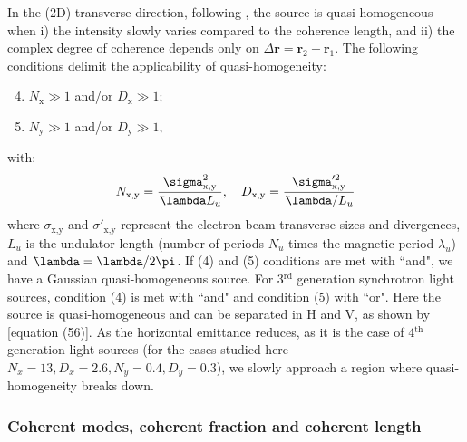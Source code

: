 \documentclass[preprint]{iucr}
\newcommand{\inred}[1]{{\color{red}#1}}
\newcommand{\lambdabar}{{\mkern0.75mu\mathchar '26\mkern -8.2mu\lambda}}
\begin{document}
In the (2D) transverse direction, following \cite{geloni2008}, the source is quasi-homogeneous  when i) the intensity slowly varies compared to the coherence length, and ii) the complex degree of coherence depends only on $\Delta\textbf{r}=\textbf{r}_2-\textbf{r}_1$. The following conditions \inred{delimit the applicability of} quasi-homogeneity: 
\begin{enumerate}%
\setcounter{enumi}{3}
\item $N_\text{x}\gg1$ and/or $D_\text{x}\gg1$;
\item $N_\text{y}\gg1$ and/or $D_\text{y}\gg1$,
\end{enumerate}
with:
\begin{equation}
    N_\text{x,y}=\frac{\sigma^2_\text{x,y}}{\lambdabar L_u}, \quad D_\text{x,y}=\frac{\sigma'^2_\text{x,y}}{\lambdabar/L_u}
\end{equation}
where $\sigma_\text{x,y}$ and $\sigma'_\text{x,y}$ represent the electron beam transverse sizes and divergences, $L_u$ is the undulator length (number of periods $N_u$ times the magnetic period $\lambda_u$) and $\lambdabar=\lambda/2\pi$.
If (4) and (5) conditions are met with ``and", we have a Gaussian quasi-homogeneous source.  For 3$^{\text{rd}}$ generation synchrotron light sources, condition (4) is met with ``and" and condition (5) with ``or". Here the source is quasi-homogeneous and can be separated in H and V, as shown by  [equation (56)]. 
As the horizontal emittance reduces, as it is the case of 4$^{\text{th}}$ generation light sources (for the cases studied here $N_x=13, D_x=2.6, N_y=0.4, D_y=0.3$), we slowly approach a region where quasi-homogeneity breaks down.

\subsubsection{Coherent modes, coherent fraction and coherent length\\}
\end{document}
